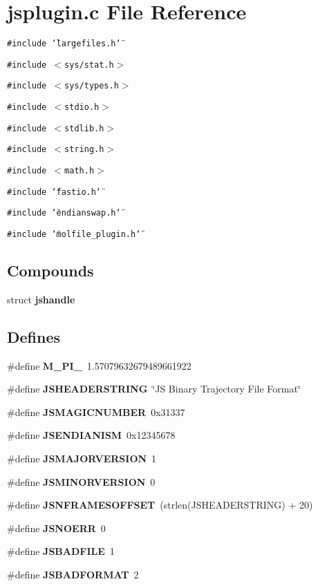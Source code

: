 \section{jsplugin.c File Reference}
\label{jsplugin_8c}
{\tt \#include \char`\"{}largefiles.h\char`\"{}}\par
{\tt \#include $<$sys/stat.h$>$}\par
{\tt \#include $<$sys/types.h$>$}\par
{\tt \#include $<$stdio.h$>$}\par
{\tt \#include $<$stdlib.h$>$}\par
{\tt \#include $<$string.h$>$}\par
{\tt \#include $<$math.h$>$}\par
{\tt \#include \char`\"{}fastio.h\char`\"{}}\par
{\tt \#include \char`\"{}endianswap.h\char`\"{}}\par
{\tt \#include \char`\"{}molfile\_\-plugin.h\char`\"{}}\par
\subsection*{Compounds}
\begin{CompactItemize}
\item 
struct {\bf jshandle}
\end{CompactItemize}
\subsection*{Defines}
\begin{CompactItemize}
\item 
\#define {\bf M\_\-PI\_}\ 1.57079632679489661922
\item 
\#define {\bf JSHEADERSTRING}\ \char`\"{}JS Binary Trajectory File Format\char`\"{}
\item 
\#define {\bf JSMAGICNUMBER}\ 0x31337
\item 
\#define {\bf JSENDIANISM}\ 0x12345678
\item 
\#define {\bf JSMAJORVERSION}\ 1
\item 
\#define {\bf JSMINORVERSION}\ 0
\item 
\#define {\bf JSNFRAMESOFFSET}\ (strlen(JSHEADERSTRING) + 20)
\item 
\#define {\bf JSNOERR}\ 0
\item 
\#define {\bf JSBADFILE}\ 1
\item 
\#define {\bf JSBADFORMAT}\ 2
\end{CompactItemize}
